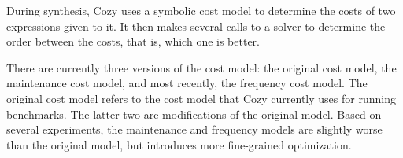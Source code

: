 During synthesis, Cozy uses a symbolic cost model to determine the costs of two
expressions given to it. It then makes several calls to a solver to determine
the order between the costs, that is, which one is better.

There are currently three versions of the cost model: the original cost model,
the maintenance cost model, and most recently, the frequency cost model.  The
original cost model refers to the cost model that Cozy currently uses for
running benchmarks. The latter two are modifications of the original model.
Based on several experiments, the maintenance and frequency models are slightly
worse than the original model, but introduces more fine-grained optimization. 
